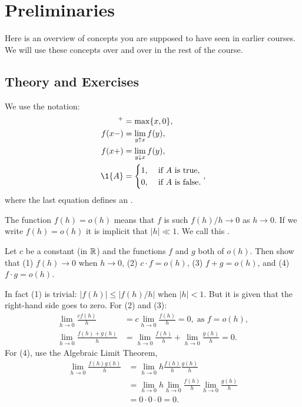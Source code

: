 \section{Preliminaries}
\label{sec:preliminaries}


Here is an overview of concepts you are supposed to have seen in earlier courses.
We will use these concepts over and over in the rest of the course.

\subsection*{Theory and Exercises}



We use the notation:
\begin{align*}
  [x]^+ &= \max\{x, 0\}, \\
  f(x-) &= \lim_{y\uparrow x} f(y),\\
  f(x+) &= \lim_{y\downarrow x} f(y),\\
    \1{A} &=
            \begin{cases}
              1, & \text{ if $A$ is true}, \\
              0, & \text{ if $A$ is false}.
            \end{cases}, 
\end{align*}
where the last equation defines an .


The function $f(h)=o(h)$ means that $f$ is such $f(h)/h \to 0$ as $h\to 0$.
If we write $f(h) = o(h)$ it is implicit that $|h| \ll 1$.
We call this .
\begin{exercise}%
  Let $c$ be a constant (in $\mathbb{R}$) and the functions $f$ and $g$ both of $o(h)$. Then show that (1) $f(h) \to 0$ when $h\to 0$, (2) $c\cdot f = o(h)$, (3) $f+g=o(h)$, and (4) $f\cdot g=o(h)$. 
 \begin{solution}
In fact (1) is trivial: $|f(h)| \leq |f(h)/h|$ when $|h| < 1$. But it is given that the right-hand side goes to zero.  For (2) and (3):
\begin{align*}
\lim_{h\to 0} \frac{c f(h)}{h} &=  c \lim_{h\to 0} \frac{f(h)}{h} = 0, \; \text{as } f = o(h), \\
\lim_{h\to 0} \frac{f(h) + g(h)} h &= \lim_{h\to 0} \frac{f(h)} h + \lim_{h\to 0} \frac{g(h)} h = 0.
\end{align*}
For (4), use  the Algebraic Limit Theorem,
\begin{align*}
\lim_{h\to 0} \frac{f(h)g(h)}{h} &= \lim_{h\to 0} h \frac{f(h)}{h} \frac{g(h)}{h} \\
&= \lim_{h\to 0} h \lim_{h\to 0} \frac{f(h)}{h} \lim_{h\to 0} \frac{g(h)}{h} \\
&= 0 \cdot 0 \cdot 0 = 0.
\end{align*}
  \end{solution}
\end{exercise}


